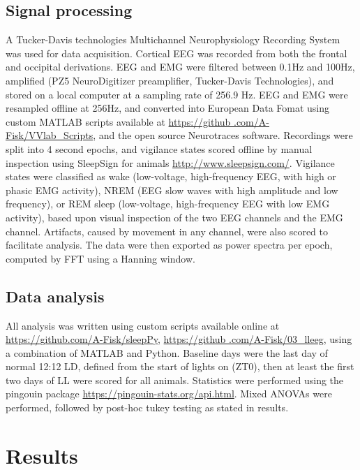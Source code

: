 \subsection{Signal processing}
A Tucker-Davis technologies Multichannel Neurophysiology Recording System was
used for data acquisition.
Cortical EEG was recorded from both the frontal and occipital derivations.
EEG and EMG were filtered between 0.1Hz and 100Hz, amplified (PZ5
NeuroDigitizer preamplifier, Tucker-Davis Technologies), and stored on a
local computer at a sampling rate of 256.9 Hz.
EEG and EMG were resampled offline at 256Hz, and converted into European
Data Fomat using custom MATLAB scripts available at \url{https://github
.com/A-Fisk/VVlab_Scripts}, and the open source Neurotraces software.
Recordings were split into 4 second epochs, and vigilance states scored
offline by manual inspection using SleepSign for animals
\url{http://www.sleepsign.com/}.
Vigilance states were classified as wake (low-voltage, high-frequency EEG,
with high or phasic EMG activity), NREM (EEG slow waves with high amplitude
and low frequency), or REM sleep (low-voltage, high-frequency EEG with low
EMG activity), based upon visual inspection of the two EEG channels and the
EMG channel.
Artifacts, caused by movement in any channel, were also scored to facilitate
analysis.
The data were then exported as power spectra per epoch, computed by FFT using a
Hanning window.


\subsection{Data analysis}
All analysis was written using custom scripts available online at
\url{https://github.com/A-Fisk/sleepPy}, \url{https://github
.com/A-Fisk/03_lleeg}, using a combination of MATLAB and Python.
Baseline days were the last day of normal 12:12 LD, defined from the start of
lights on (ZT0), then at least the first two days of LL were scored for all
animals.
Statistics were performed using the pingouin package
\url{https://pingouin-stats.org/api.html}.
Mixed ANOVAs were performed, followed by post-hoc tukey testing as stated in
results.


\section{Results}




